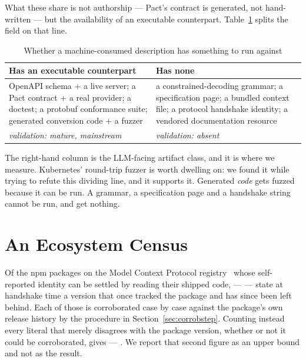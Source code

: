\documentclass[10pt,journal,compsoc]{IEEEtran}
\begin{document}
What these share is not authorship --- Pact's contract is generated, not hand-written
--- but the availability of an executable counterpart. Table~\ref{tab:counterpart}
splits the field on that line.

\begin{table}[t]
\caption{Whether a machine-consumed description has something to run against}
\label{tab:counterpart}
\centering\footnotesize
\begin{tabular}{@{}p{}p{}@{}}
\toprule
\textbf{Has an executable counterpart} & \textbf{Has none} \\
\midrule
OpenAPI schema + a live server; a Pact contract + a real provider; a doctest; a
protobuf conformance suite; generated conversion code + a fuzzer &
a constrained-decoding grammar; a specification page; a bundled context file; a
protocol handshake identity; a vendored documentation resource \\
\addlinespace
\emph{validation: mature, mainstream} & \emph{validation: absent} \\
\bottomrule
\end{tabular}
\end{table}

The right-hand column is the LLM-facing artifact class, and it is where we measure.
Kubernetes' round-trip fuzzer is worth dwelling on: we found it while trying to refute
this dividing line, and it supports it. Generated \emph{code} gets fuzzed because it can
be run. A grammar, a specification page and a handshake string cannot be run, and get
nothing.

\section{An Ecosystem Census}\label{sec:census}

Of the \factEcoApplicable{} npm packages on the Model Context Protocol
registry~\cite{mcp2026spec} whose self-reported identity can be settled by reading their
shipped code, \factEcoDriftConfirmed{} --- \factEcoDriftConfirmedPct{} --- state at handshake
time a version that once tracked the package and has since been left behind. Each of those is
corroborated case by case against the package's own release history by the procedure in
Section~\ref{sec:corrobstep}. Counting instead every literal that merely disagrees with the
package version, whether or not it could be corroborated, gives \factEcoDriftRaw{} ---
\factEcoDriftRawPct{}. We report that second figure as an upper bound and not as the result.
\end{document}

